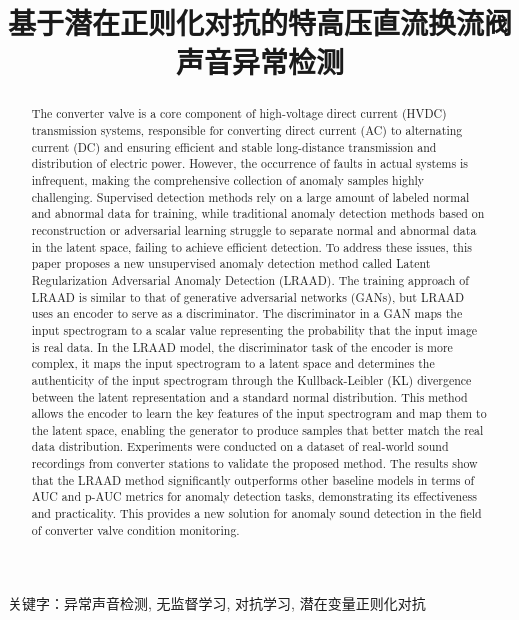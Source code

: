 \documentclass{article}
\title{基于潜在正则化对抗的特高压直流换流阀声音异常检测}
\begin{document}
\maketitle

\begin{abstract}

The converter valve is a core component of high-voltage direct current (HVDC) transmission systems, responsible for converting direct current (AC) to alternating current (DC) and ensuring efficient and stable long-distance transmission and distribution of electric power. However, the occurrence of faults in actual systems is infrequent, making the comprehensive collection of anomaly samples highly challenging. Supervised detection methods rely on a large amount of labeled normal and abnormal data for training, while traditional anomaly detection methods based on reconstruction or adversarial learning struggle to separate normal and abnormal data in the latent space, failing to achieve efficient detection.
To address these issues, this paper proposes a new unsupervised anomaly detection method called Latent Regularization Adversarial Anomaly Detection (LRAAD). The training approach of LRAAD is similar to that of generative adversarial networks (GANs), but LRAAD uses an encoder to serve as a discriminator. The discriminator in a GAN maps the input spectrogram to a scalar value representing the probability that the input image is real data. In the LRAAD model, the discriminator task of the encoder is more complex, it maps the input spectrogram to a latent space and determines the authenticity of the input spectrogram through the Kullback-Leibler (KL) divergence between the latent representation and a standard normal distribution. This method allows the encoder to learn the key features of the input spectrogram and map them to the latent space, enabling the generator to produce samples that better match the real data distribution.
Experiments were conducted on a dataset of real-world sound recordings from converter stations to validate the proposed method. The results show that the LRAAD method significantly outperforms other baseline models in terms of AUC and p-AUC metrics for anomaly detection tasks, demonstrating its effectiveness and practicality. This provides a new solution for anomaly sound detection in the field of converter valve condition monitoring.

\end{abstract}


关键字：异常声音检测, 无监督学习, 对抗学习, 潜在变量正则化对抗
\end{document}

